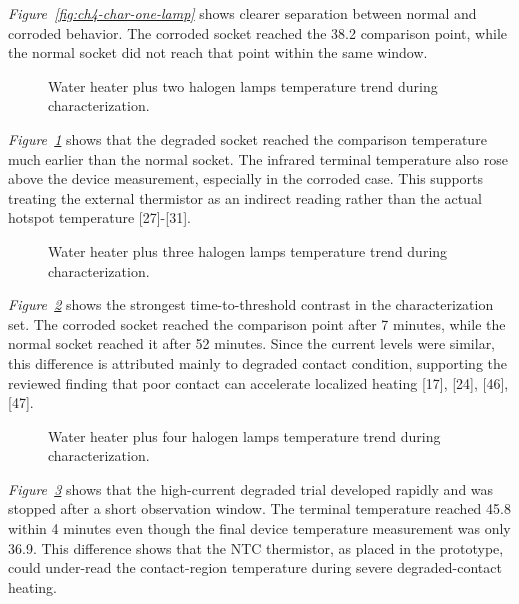 \textit{Figure~\ref{fig:ch4-char-one-lamp}} shows clearer separation between
normal and corroded behavior. The corroded socket reached the 38.2{\degreeC}
comparison point, while the normal socket did not reach that point within the
same window.

\begin{figure}[H]
  \centering
  \caption{Water heater plus two halogen lamps temperature trend during characterization.}
  \label{fig:ch4-char-two-lamps}
\end{figure}

\textit{Figure~\ref{fig:ch4-char-two-lamps}} shows that the degraded socket
reached the comparison temperature much earlier than the normal socket. The
infrared terminal temperature also rose above the device
measurement, especially in the corroded case. This supports treating 
the external thermistor as an indirect reading rather
than the actual hotspot temperature [27]-[31].

\begin{figure}[H]
  \centering
  \caption{Water heater plus three halogen lamps temperature trend during characterization.}
  \label{fig:ch4-char-three-lamps}
\end{figure}

\textit{Figure~\ref{fig:ch4-char-three-lamps}} shows the strongest
time-to-threshold contrast in the characterization set. The corroded socket
reached the comparison point after 7 minutes, while the normal socket reached it
after 52 minutes. Since the current levels were similar, this difference is
attributed mainly to degraded contact condition, supporting the reviewed finding
that poor contact can accelerate localized heating [17], [24], [46], [47].

\begin{figure}[H]
  \centering
  \caption{Water heater plus four halogen lamps temperature trend during characterization.}
  \label{fig:ch4-char-four-lamps}
\end{figure}

\textit{Figure~\ref{fig:ch4-char-four-lamps}} shows that the high-current
degraded trial developed rapidly and was stopped after a short observation
window. The terminal temperature reached 45.8{\degreeC} within 4 minutes even
though the final device temperature measurement was only 36.9{\degreeC}. This
difference shows that the NTC thermistor, as placed in the prototype, could
under-read the contact-region temperature during severe degraded-contact
heating.

